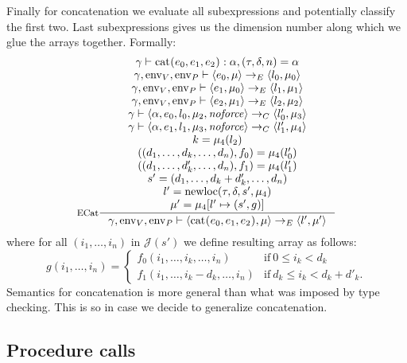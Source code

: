 \documentclass[a4paper, 10pt, draft]{report}
\DeclareMathOperator*{\env}{env}
\DeclareMathOperator*{\newloc}{newloc}
\DeclareMathOperator*{\noforce}{\mathit{noforce}}
\newcommand{\mycode}[1]{\ensuremath{\mbox{\lstinline{#1}}}}
\begin{document}
Finally for concatenation we evaluate all subexpressions and potentially
classify the first two. Last subexpressions gives us the dimension number along which
we glue the arrays together. Formally:
\[ \inference[ECat]
{
\gamma |- \mycode{cat(} e_0, e_1, e_2 \mycode{)} : \alpha, \left( \tau, \delta, n \right) = \alpha \\
  \gamma, \env_V, \env_P |- \left< e_0 , \mu \right> \to_E \left< l_0, \mu_0 \right> \\
  \gamma, \env_V, \env_P |- \left< e_1 , \mu_0 \right> \to_E \left< l_1, \mu_1 \right> \\
  \gamma, \env_V, \env_P |- \left< e_2 , \mu_1 \right> \to_E \left< l_2, \mu_2 \right> \\
  \gamma |- \left< \alpha, e_0, l_0, \mu_2, \noforce \right> \to_C \left<l'_0, \mu_3 \right> \\
  \gamma |- \left< \alpha, e_1, l_1, \mu_3, \noforce \right> \to_C \left<l'_1, \mu_4 \right> \\
  k = \mu_4(l_2) \\
  \left((d_1, \ldots, d_k, \ldots, d_n), f_0 \right) = \mu_4(l'_0)\\
  \left((d_1, \ldots, d'_k, \ldots, d_n), f_1 \right) = \mu_4(l'_1)\\
  s' = (d_1,\ldots,d_k+d'_k,\ldots,d_n) \\
  l' = \newloc(\tau, \delta, s', \mu_4) \\
  \mu' = \mu_4[ l' \mapsto (s', g) ]
}{
  \gamma, \env_V, \env_P |- \left<\mycode{cat(} e_0, e_1, e_2 \mycode{)}, \mu \right> \to_E \left< l', \mu' \right>
}\]
where for all $(i_1,\ldots,i_n)$ in $\mathcal{J}(s')$ we define resulting array as follows: \[
    g(i_1,\ldots,i_n) = \begin{cases}
      f_0(i_1,\ldots,i_k,\ldots,i_n) & \text{if}\ 0 \leq i_k < d_k \\
      f_1(i_1,\ldots,i_k - d_k, \ldots, i_n) & \text{if}\ d_k \leq i_k < d_k + d'_k.
    \end{cases}
  \]
Semantics for concatenation is more general than what was imposed by type
checking. This is so in case we decide to generalize concatenation.

\subsection{Procedure calls}\label{sec:semantics:expr:proc}
\end{document}
